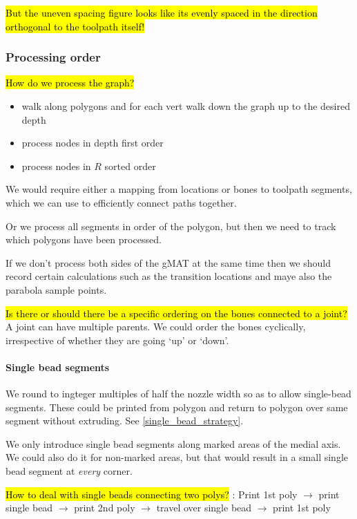 \hl{But the uneven spacing figure looks like its evenly spaced in the direction orthogonal to the toolpath itself!}




\subsubsection{Processing order}
\hl{How do we process the graph?}
\begin{itemize}
\item walk along polygons and for each vert walk down the graph up to the desired depth
\item process nodes in depth first order
\item process nodes in $R$ sorted order
\end{itemize}

We would require either a mapping from locations or bones to toolpath segments, which we can use to efficiently connect paths together.

Or we process all segments in order of the polygon, but then we need to track which polygons have been processed.

If we don't process both sides of the gMAT at the same time then we should record certain calculations such as the transition locations and maye also the parabola sample points.

\hl{Is there or should there be a specific ordering on the bones connected to a joint?}
A joint can have multiple parents.
We could order the bones cyclically, irrespective of whether they are going `up' or `down'.




\paragraph{Single bead segments}
We round to ingteger multiples of half the nozzle width so as to allow single-bead segments.
These could be printed from polygon and return to polygon over same segment without extruding.
See \cref{single_bead_strategy}.

We only introduce single bead segments along marked areas of the medial axis.
We could also do it for non-marked areas, but that would result in a small single bead segment at \emph{every} corner.


\hl{How to deal with single beads connecting two polys?}
: Print 1st poly $\to$ print single bead $\to$ print 2nd poly $\to$ travel over single bead $\to$ print 1st poly

